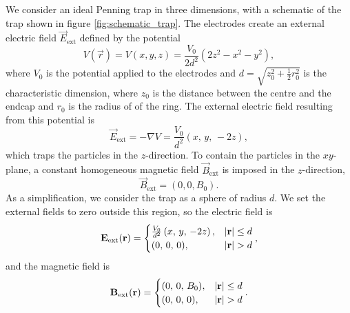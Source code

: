 We consider an ideal Penning trap in three dimensions, with a schematic of the trap shown in figure \ref{fig:schematic_trap}. The electrodes create an external electric field $\vec{E}_\mathrm{ext}$ defined by the potential
\begin{equation}
    V (\vec{r})= V(x,y,z) = \frac{V_0}{2d^2}(2z^2 - x^2 - y^2), \label{eq:penning_potential}
\end{equation}
where $V_0$ is the potential applied to the electrodes and $d= \sqrt{z_0^2+ \frac{1}{2}r_0^2}$ is the characteristic dimension, where $z_0$ is the distance between the centre and the endcap and $r_0$ is the radius of of the ring. The external electric field resulting from this potential is  
\begin{equation}
    \vec{E}_\mathrm{ext} = -\nabla V = \frac{V_0}{d^2} (x,\,y,\,-2z), \label{eq:p1_E_field_pot_gradient}
\end{equation}
which traps the particles in the $z$-direction. To contain the particles in the $xy$-plane, a constant homogeneous magnetic field $\vec{B}_\mathrm{ext}$ is imposed in the $z$-direction,
\begin{equation}
    \vec{B}_\mathrm{ext} = (0,0,B_0). \label{eq:homogeneous_B_field}
\end{equation}
As a simplification, we consider the trap as a sphere of radius $d$. We set the external fields to zero outside this region, so the electric field is   
\begin{equation}\label{eq:trap_ext_E_field}
    \mathbf{E}_\mathrm{ext} (\mathbf{r}) = 
    \begin{cases}
        \frac{V_0}{d^2} \left( x,\, y,\, -2z \right), & \abs{\mathbf{r}} \leq d \\
        (0,\,0,\,0),  & \abs{\mathbf{r}} > d
    \end{cases}, 
\end{equation}
and the magnetic field is 
\begin{equation}\label{eq:trap_ext_B_field}
    \mathbf{B}_\mathrm{ext} (\mathbf{r}) = 
    \begin{cases}
        (0,\,0,\,B_0), & \abs{\mathbf{r}} \leq d \\
        (0,\,0,\,0), & \abs{\mathbf{r}} > d
    \end{cases}.
\end{equation}

